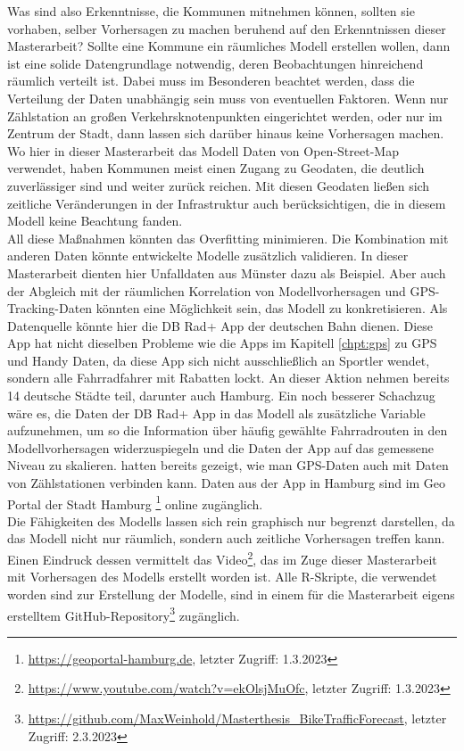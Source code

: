\documentclass[a4paper,12pt]{thesis}
\begin{document}
Was sind also Erkenntnisse, die Kommunen mitnehmen können, sollten sie vorhaben, selber Vorhersagen zu machen beruhend auf den Erkenntnissen dieser Masterarbeit? Sollte eine Kommune ein räumliches Modell erstellen wollen, dann ist eine solide Datengrundlage notwendig, deren Beobachtungen hinreichend räumlich verteilt ist. Dabei muss im Besonderen beachtet werden, dass die Verteilung der Daten unabhängig sein muss von eventuellen Faktoren. Wenn nur Zählstation an großen Verkehrsknotenpunkten eingerichtet werden, oder nur im Zentrum der Stadt, dann lassen sich darüber hinaus keine Vorhersagen machen. Wo hier in dieser Masterarbeit das Modell Daten von Open-Street-Map verwendet, haben Kommunen meist einen Zugang zu Geodaten, die deutlich zuverlässiger sind und weiter zurück reichen. Mit diesen Geodaten ließen sich zeitliche Veränderungen in der Infrastruktur auch berücksichtigen, die in diesem Modell keine Beachtung fanden.\\
All diese Maßnahmen könnten das Overfitting minimieren. Die Kombination mit anderen Daten könnte entwickelte Modelle zusätzlich validieren. In dieser Masterarbeit dienten hier Unfalldaten aus Münster dazu als Beispiel. Aber auch der Abgleich mit der räumlichen Korrelation von Modellvorhersagen und GPS-Tracking-Daten könnten eine Möglichkeit sein, das Modell zu konkretisieren. Als Datenquelle könnte hier die DB Rad+ App der deutschen Bahn dienen. Diese App hat nicht dieselben Probleme wie die Apps im Kapitell \ref{chpt:gps} zu GPS und Handy Daten, da diese App sich nicht ausschließlich an Sportler wendet, sondern alle Fahrradfahrer mit Rabatten lockt. An dieser Aktion nehmen bereits 14 deutsche Städte teil, darunter auch Hamburg. Ein noch besserer Schachzug wäre es, die Daten der DB Rad+ App in das Modell als zusätzliche Variable aufzunehmen, um so die Information über häufig gewählte Fahrradrouten in den Modellvorhersagen widerzuspiegeln und die Daten der App auf das gemessene Niveau zu skalieren. \cite{Alattar2021} hatten bereits gezeigt, wie man GPS-Daten auch mit Daten von Zählstationen verbinden kann. Daten aus der App in Hamburg sind im Geo Portal der Stadt Hamburg \footnote{\url{https://geoportal-hamburg.de}, letzter Zugriff: 1.3.2023} online zugänglich.\\

Die Fähigkeiten des Modells lassen sich rein graphisch nur begrenzt darstellen, da das Modell nicht nur räumlich, sondern auch zeitliche Vorhersagen treffen kann. Einen Eindruck dessen vermittelt das Video\footnote{\url{https://www.youtube.com/watch?v=ekOlsjMuOfc}, letzter Zugriff: 1.3.2023}, das im Zuge dieser Masterarbeit mit Vorhersagen des Modells erstellt worden ist. Alle R-Skripte, die verwendet worden sind zur Erstellung der Modelle, sind in einem für die Masterarbeit eigens erstelltem GitHub-Repository\footnote{\url{https://github.com/MaxWeinhold/Masterthesis_BikeTrafficForecast}, letzter Zugriff: 2.3.2023} zugänglich.
\end{document}
